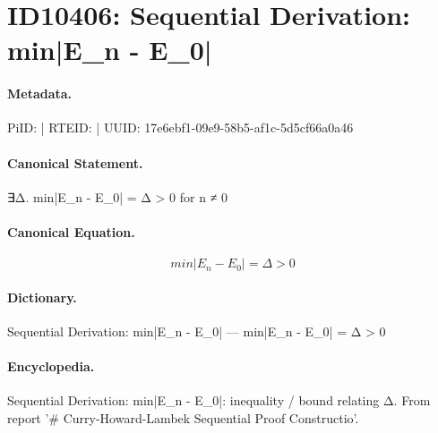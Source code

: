 \section*{ID10406: Sequential Derivation: min|E\_n - E\_0|}
\paragraph{Metadata.}
PiID:  | RTEID:  | UUID: 17e6ebf1-09e9-58b5-af1c-5d5cf66a0a46

\paragraph{Canonical Statement.}
∃Δ. min|E\_n - E\_0| = Δ > 0 for n ≠ 0

\paragraph{Canonical Equation.}
\[
min|E_n - E_0| = Δ > 0
\]

\paragraph{Dictionary.}
Sequential Derivation: min|E\_n - E\_0| — min|E\_n - E\_0| = Δ > 0

\paragraph{Encyclopedia.}
Sequential Derivation: min|E\_n - E\_0|: inequality / bound relating Δ. From report '\# Curry-Howard-Lambek Sequential Proof Constructio'.
